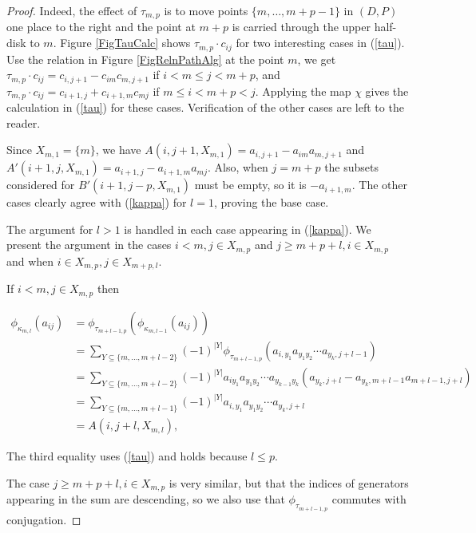 \documentclass[11pt]{amsart}
\def\t{{\tau}}
\def\k{{\kappa}}
\theoremstyle{definition}
\begin{document}
\begin{proof}
Indeed, the effect of $\tau_{m,p}$ is to move points $\{m,\ldots,m+p-1\}$ in $(D,P)$ one place to the right and the point at $m+p$ is carried through the upper half-disk to $m$. Figure \ref{FigTauCalc} shows $\t_{m,p}\cdot c_{ij}$ for two interesting cases in (\ref{tau}). Use the relation in Figure \ref{FigRelnPathAlg} at the point $m$, we get $\t_{m,p}\cdot c_{ij} = c_{i,j+1}-c_{im}c_{m,j+1}$ if $i<m\le j<m+p$, and $\t_{m,p}\cdot c_{ij} = c_{i+1,j}+c_{i+1,m}c_{mj}$ if $m\le i<m+p<j$. Applying the map $\chi$ gives the calculation in (\ref{tau}) for these cases. Verification of the other cases are left to the reader.

Since $X_{m,1}=\{m\}$, we have $A(i,j+1,X_{m,1})=a_{i,j+1}-a_{im}a_{m,j+1}$ and $A'(i+1,j,X_{m,1})=a_{i+1,j}-a_{i+1,m}a_{mj}$. Also, when $j=m+p$ the subsets considered for $B'(i+1,j-p,X_{m,1})$ must be empty, so it is $-a_{i+1,m}$. The other cases clearly agree with (\ref{kappa}) for $l=1$, proving the base case.

The argument for $l>1$ is handled in each case appearing in (\ref{kappa}).  We present the argument in the cases $i<m,j\in X_{m,p}$ and $j\ge m+p+l,i\in X_{m,p}$ and when $i\in X_{m,p}, j\in X_{m+p,l}$.

If $i<m, j\in X_{m,p}$ then

\begin{align*}
\phi_{\k_{m,l}}(a_{ij}) &= \phi_{\t_{m+l-1,p}}(\phi_{\k_{m,l-1}}(a_{ij}))\\
&= \sum_{{\scriptscriptstyle Y\subseteq \{m,\ldots,m+l-2\}}} (-1)^{|Y|} \phi_{\t_{m+l-1,p}}(a_{i,y_1}a_{y_1y_2}\cdots a_{y_k,j+l-1})\\
&= \sum_{{\scriptscriptstyle Y\subseteq \{m,\ldots,m+l-2\}}} (-1)^{|Y|} a_{iy_1}a_{y_1y_2}\cdots a_{y_{k-1}y_k}(a_{y_k,j+l}-a_{y_k,m+l-1}a_{m+l-1,j+l})\\
&= \sum_{{\scriptscriptstyle Y\subseteq \{m,\ldots,m+l-1\}}} (-1)^{|Y|} a_{i,y_1}a_{y_1y_2}\cdots a_{y_k,j+l}\\
&= A(i,j+l,X_{m,l}),
\end{align*}

The third equality uses (\ref{tau}) and holds because $l\le p$. 

The case $j\ge m+p+l,i\in X_{m,p}$ is very similar, but that the indices of generators appearing in the sum are descending, so we also use that $\phi_{\t_{m+l-1,p}}$ commutes with conjugation.


\end{proof}
\end{document}
